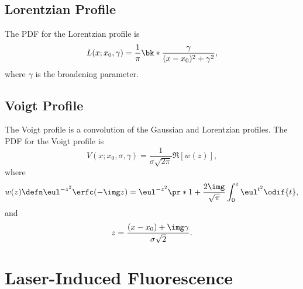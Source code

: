 \documentclass[11pt, twoside, fleqn]{report}
\begin{document}
\section{Lorentzian Profile}
\label{s:lorentzian_profile}

The PDF for the Lorentzian profile is
\begin{equation*}
    L(x; x_0, \gamma) = \frac{1}{\pi}\bk*{\frac{\gamma}{(x - x_0)^2 + \gamma^2}},
\end{equation*}
where $\gamma$ is the broadening parameter.

\section{Voigt Profile}
\label{s:voigt_profile}

The Voigt profile is a convolution of the Gaussian and Lorentzian profiles. The PDF for the Voigt profile is
\begin{equation*}
    V(x; x_0, \sigma, \gamma) = \frac{1}{\sigma\sqrt{2\pi}}\Re[w(z)],
\end{equation*}
where
\begin{equation*}
    w(z) \defn \eul^{-z^2}\erfc(-\img z) = \eul^{-z^2}\pr*{1 + 
    \frac{2\img}{\sqrt{\pi}}\int_0^z \eul^{t^2} \odif{t}},
\end{equation*}
and
\begin{equation*}
    z = \frac{(x - x_0) + \img\gamma}{\sigma\sqrt{2}}.
\end{equation*}

\begin{figure}[H]
    \centering
\end{figure}

\chapter{Laser-Induced Fluorescence}
\label{c:laser-induced_flourescence}
\end{document}
